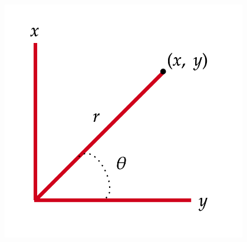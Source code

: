 \begin{marginfigure}
\begin{center}
\includegraphics[width=0.8\textwidth]{figures/wk-2/fig-26.png}
\end{center}
\end{marginfigure}

